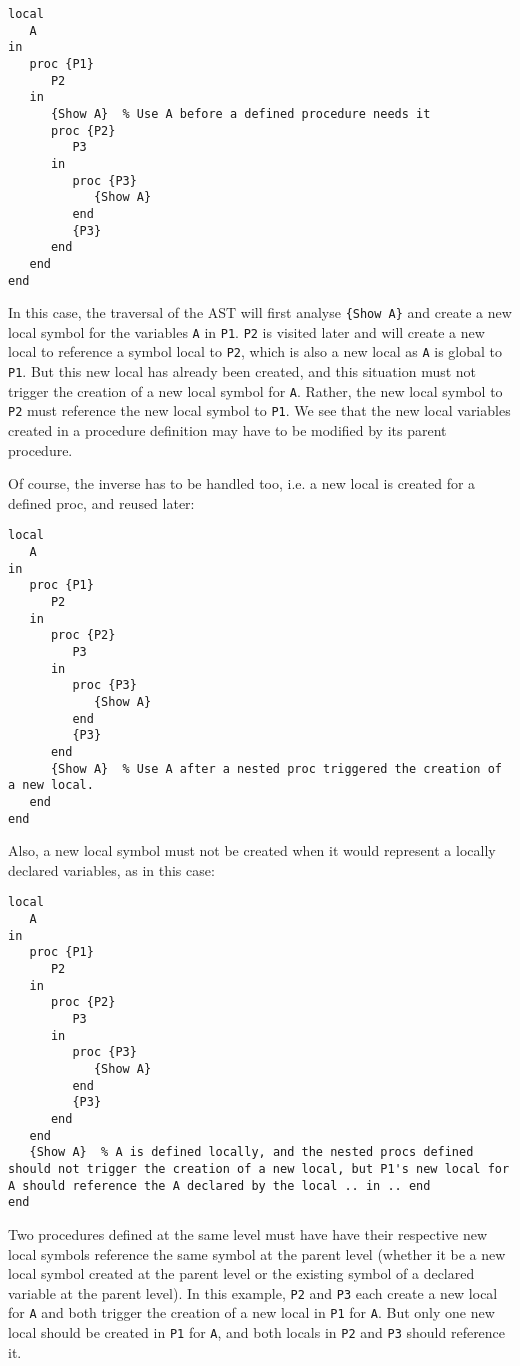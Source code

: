\documentclass[a4paper]{memoir}
\begin{document}
\begin{lstlisting}
local
   A
in
   proc {P1}
      P2
   in
      {Show A}  % Use A before a defined procedure needs it
      proc {P2}
         P3
      in
         proc {P3}
            {Show A}
         end
         {P3}
      end
   end
end
\end{lstlisting}

In this case, the traversal of the AST will first analyse \lstinline!{Show A}! and create a new local symbol for the variables \lstinline!A! in \lstinline!P1!. \lstinline!P2! is visited later and will create a new local to reference a symbol local to \lstinline!P2!, which is also a new local as \lstinline!A! is global to \lstinline!P1!. But this new local has already been created, and this situation must not trigger the creation of a new local symbol for \lstinline!A!. Rather, the new local symbol to \lstinline!P2! must reference the new local symbol to \lstinline!P1!. We see that the new local variables created in a procedure definition may have to be modified by its parent procedure.

Of course, the inverse has to be handled too, i.e. a new local is created for a defined proc, and reused later:

\begin{lstlisting}
local
   A
in
   proc {P1}
      P2
   in
      proc {P2}
         P3
      in
         proc {P3}
            {Show A}
         end
         {P3}
      end
      {Show A}  % Use A after a nested proc triggered the creation of a new local.
   end
end
\end{lstlisting}


Also, a new local symbol must not be created when it would represent a locally declared variables, as in this case:

\begin{lstlisting}
local
   A
in
   proc {P1}
      P2
   in
      proc {P2}
         P3
      in
         proc {P3}
            {Show A}
         end
         {P3}
      end
   end
   {Show A}  % A is defined locally, and the nested procs defined should not trigger the creation of a new local, but P1's new local for A should reference the A declared by the local .. in .. end
end
\end{lstlisting}

Two procedures defined at the same level must have have their respective new local symbols reference the same symbol at the parent level (whether it be a new local symbol created at the parent level or the existing symbol of a declared variable at the parent level). In this example, \lstinline!P2! and \lstinline!P3! each create a new local for \lstinline!A! and both trigger the creation of a new local in \lstinline!P1! for \lstinline!A!. But only one new local should be created in \lstinline!P1! for \lstinline!A!, and both locals in \lstinline!P2! and \lstinline!P3! should reference it.
\end{document}
